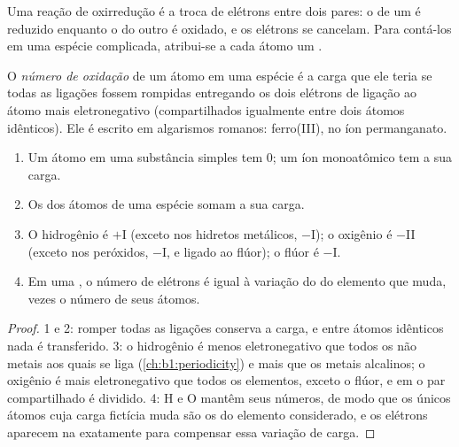 Uma reação de oxirredução é a troca de elétrons entre dois pares: o
 de um é reduzido enquanto o  do outro é oxidado, e os
elétrons se cancelam. Para contá-los em uma espécie complicada,
atribui-se a cada átomo um .

\begin{definition}\label{def:b1:nernst:oxidation-number}
O \emph{número de oxidação} de um átomo em uma
espécie é a carga que ele teria se todas as ligações fossem rompidas
entregando os dois elétrons de ligação ao átomo mais eletronegativo
(compartilhados igualmente entre dois átomos idênticos). Ele é escrito
em algarismos romanos: ferro(III),  no íon permanganato.
\end{definition}

\begin{proposition}\label{prop:b1:nernst:on-rules}
\begin{enumerate}
  \item Um átomo em uma substância simples tem  0; um
        íon monoatômico tem a sua carga.
  \item Os  dos átomos de uma espécie somam a sua
        carga.
  \item O hidrogênio é $+$I (exceto nos hidretos metálicos, $-$I); o
        oxigênio é $-$II (exceto nos peróxidos, $-$I, e ligado ao flúor);
        o flúor é $-$I.
  \item Em uma , o número de elétrons é igual à variação do
         do elemento que muda, vezes o número de seus
        átomos.
\end{enumerate}
\end{proposition}

\begin{proof}
1 e 2: romper todas as ligações conserva a carga, e entre átomos
idênticos nada é transferido. 3: o hidrogênio é menos eletronegativo que
todos os não metais aos quais se liga (\cref{ch:b1:periodicity}) e mais
que os metais alcalinos; o oxigênio é mais eletronegativo que todos os
elementos, exceto o flúor, e em  o par compartilhado é dividido.
4: H e O mantêm seus números, de modo que os únicos átomos cuja carga
fictícia muda são os do elemento considerado, e os elétrons aparecem na
 exatamente para compensar essa variação de carga.
\end{proof}

